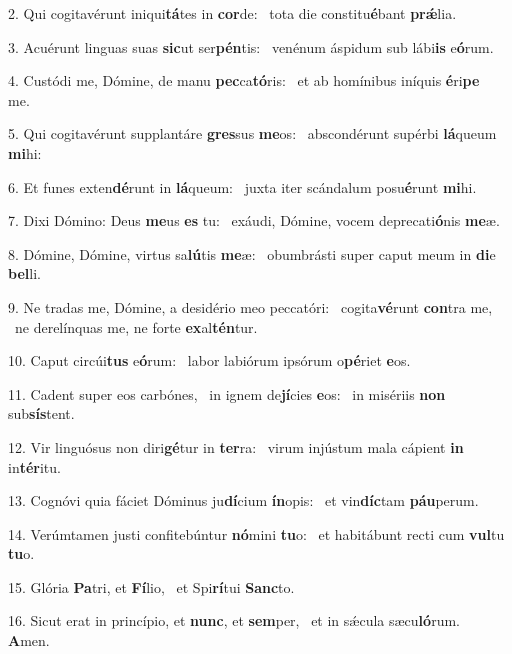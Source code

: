 2. Qui cogitavérunt iniqui\textbf{tá}tes in \textbf{cor}de: \ast\  tota die constitu\textbf{é}bant \textbf{prǽ}lia.\

3. Acuérunt linguas suas \textbf{sic}ut ser\textbf{pén}tis: \ast\  venénum áspidum sub lábi\textbf{is} e\textbf{ó}rum.\

4. Custódi me, Dómine, de manu \textbf{pec}ca\textbf{tó}ris: \ast\  et ab homínibus iníquis \textbf{é}ri\textbf{pe} me.\

5. Qui cogitavérunt supplantáre \textbf{gres}sus \textbf{me}os: \ast\  abscondérunt supérbi \textbf{lá}queum \textbf{mi}hi:\

6. Et funes exten\textbf{dé}runt in \textbf{lá}queum: \ast\  juxta iter scándalum posu\textbf{é}runt \textbf{mi}hi.\

7. Dixi Dómino: Deus \textbf{me}us \textbf{es} tu: \ast\  exáudi, Dómine, vocem deprecati\textbf{ó}nis \textbf{me}æ.\

8. Dómine, Dómine, virtus sa\textbf{lú}tis \textbf{me}æ: \ast\  obumbrásti super caput meum in \textbf{di}e \textbf{bel}li.\

9. Ne tradas me, Dómine, a desidério meo peccatóri: \dag\  cogita\textbf{vé}runt \textbf{con}tra me, \ast\  ne derelínquas me, ne forte \textbf{ex}al\textbf{tén}tur.\

10. Caput circúi\textbf{tus} e\textbf{ó}rum: \ast\  labor labiórum ipsórum o\textbf{pé}riet \textbf{e}os.\

11. Cadent super eos carbónes, \dag\  in ignem de\textbf{jí}cies \textbf{e}os: \ast\  in misériis \textbf{non} sub\textbf{sís}tent.\

12. Vir linguósus non diri\textbf{gé}tur in \textbf{ter}ra: \ast\  virum injústum mala cápient \textbf{in} in\textbf{tér}itu.\

13. Cognóvi quia fáciet Dóminus ju\textbf{dí}cium \textbf{ín}opis: \ast\  et vin\textbf{díc}tam \textbf{páu}perum.\

14. Verúmtamen justi confitebúntur \textbf{nó}mini \textbf{tu}o: \ast\  et habitábunt recti cum \textbf{vul}tu \textbf{tu}o.\

15. Glória \textbf{Pa}tri, et \textbf{Fí}lio, \ast\  et Spi\textbf{rí}tui \textbf{Sanc}to.\

16. Sicut erat in princípio, et \textbf{nunc}, et \textbf{sem}per, \ast\  et in sǽcula sæcu\textbf{ló}rum. \textbf{A}men.\

